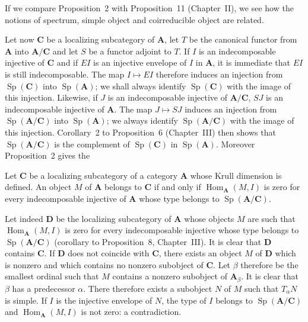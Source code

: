 If we compare Proposition~2 with Proposition~11 (Chapter~II), we see
how the notions of spectrum, simple object and coirreducible object are
related.

Let now $\mathbf{C}$ be a localizing subcategory of $\mathbf{A}$, let
$T$ be the canonical functor from $\mathbf{A}$ into
$\mathbf{A}/\mathbf{C}$ and let $S$ be a functor adjoint to $T$. If
$I$ is an indecomposable injective of $\mathbf{C}$ and if $EI$ is an
injective envelope of $I$ in $\mathbf{A}$, it is immediate that $EI$
is still indecomposable. The map $I \mapsto EI$ therefore induces an
injection from $\operatorname{Sp}(\mathbf{C})$ into
$\operatorname{Sp}(\mathbf{A})$; we shall always identify
$\operatorname{Sp}(\mathbf{C})$ with the image of this injection.
Likewise, if $J$ is an indecomposable injective of
$\mathbf{A}/\mathbf{C}$, $SJ$ is an indecomposable injective of
$\mathbf{A}$. The map $J \mapsto SJ$ induces an injection from
$\operatorname{Sp}(\mathbf{A}/\mathbf{C})$ into
$\operatorname{Sp}(\mathbf{A})$; we always identify
$\operatorname{Sp}(\mathbf{A}/\mathbf{C})$ with the image of this
injection. Corollary~2 to Proposition~6 (Chapter~III) then shows that
$\operatorname{Sp}(\mathbf{A}/\mathbf{C})$ is the complement of
$\operatorname{Sp}(\mathbf{C})$ in $\operatorname{Sp}(\mathbf{A})$.
Moreover Proposition~2 gives the

\begin{corollary}
Let $\mathbf{C}$ be a localizing subcategory of a category
$\mathbf{A}$ whose Krull dimension is defined. An object $M$ of
$\mathbf{A}$ belongs to $\mathbf{C}$ if and only if
$\operatorname{Hom}_{\mathbf{A}}(M, I)$ is zero for every
indecomposable injective of $\mathbf{A}$ whose type belongs to
$\operatorname{Sp}(\mathbf{A}/\mathbf{C})$.
\end{corollary}

Let indeed $\mathbf{D}$ be the localizing subcategory of
$\mathbf{A}$ whose objects $M$ are such that
$\operatorname{Hom}_{\mathbf{A}}(M, I)$ is zero for every
indecomposable injective whose type belongs to
$\operatorname{Sp}(\mathbf{A}/\mathbf{C})$ (corollary to
Proposition~8, Chapter~III). It is clear that $\mathbf{D}$ contains
$\mathbf{C}$. If $\mathbf{D}$ does not coincide with $\mathbf{C}$,
there exists an object $M$ of $\mathbf{D}$ which is nonzero and which
contains no nonzero subobject of $\mathbf{C}$. Let $\beta$ therefore
be the smallest ordinal such that $M$ contains a nonzero subobject of
$\mathbf{A}_\beta$. It is clear that $\beta$ has a predecessor
$\alpha$. There therefore exists a subobject $N$ of $M$ such that
$T_\alpha N$ is simple. If $I$ is the injective envelope of $N$, the
type of $I$ belongs to $\operatorname{Sp}(\mathbf{A}/\mathbf{C})$
and $\operatorname{Hom}_{\mathbf{A}}(M, I)$ is not zero: a
contradiction.

